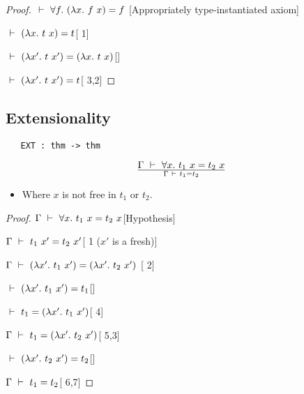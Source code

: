 \vspace{12pt plus2pt minus1pt}

\begin{proof}
\item $\ \vdash\ \forall f.\ (\lambda x.\ f\ x) = f$\hfill
[Appropriately type-instantiated axiom]
\item  $\ \vdash\ (\lambda x.\ t\ x) = t$\hfill [ 1]
\item $\turn(\lquant{x'}t\ x')=(\lquant{x}t\ x)$\hfill []
\item $\ \vdash\ (\lambda x'.\ t\ x')=t$\hfill [ 3,2]
\end{proof}



\subsection{Extensionality}

\begin{holboxed}
\begin{verbatim}
   EXT : thm -> thm
\end{verbatim}
\end{holboxed}

\vspace{12pt plus2pt minus1pt}

$$\Gamma\turn\uquant{x} t_1\ x = t_2\ x\over\Gamma\turn t_1=t_2$$
\begin{itemize}
\item Where $x$ is not free in $t_1$ or $t_2$.
\end{itemize}

\vspace{12pt plus2pt minus1pt}

\begin{proof}
\item $\Gamma\turn\uquant{x}t_1\ x=t_2\ x$\hfill [Hypothesis]
\item $\Gamma\ \vdash\  t_1\ x'=t_2\ x'$\hfill [ 1 ($x'$ is a fresh)]
\item $\Gamma\ \vdash\ (\lambda x'.\ t_1\ x') = (\lambda x'.\ t_2\ x')$\hfill
        [ 2]
\item $\ \vdash\ (\lambda x'.\ t_1\ x') = t_1$\hfill []
\item $\ \vdash\  t_1 = (\lambda x'.\ t_1\ x')$\hfill [ 4]
\item $\Gamma\turn t_1 = (\lquant{x'}t_2\ x')$\hfill [ 5,3]
\item $\ \vdash\ (\lambda x'.\ t_2\ x') = t_2$\hfill []
\item $\Gamma\ \vdash\  t_1=t_2$\hfill [ 6,7]
\end{proof}





